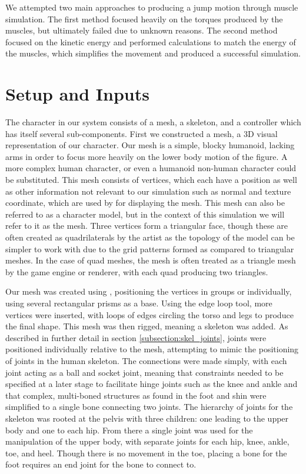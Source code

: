 We attempted two main approaches to producing a jump motion through muscle simulation.  The first method focused heavily on the torques produced by the muscles, but ultimately failed due to unknown reasons.  The second method focused on the kinetic energy and performed calculations to match the energy of the muscles, which simplifies the movement and produced a successful simulation.

\section{Setup and Inputs}
\label{section:setup_inputs}
The character in our system consists of a mesh, a skeleton, and a controller which has itself several sub-components.  First we constructed a mesh, a 3D visual representation of our character.  Our mesh is a simple, blocky humanoid, lacking arms in order to focus more heavily on the lower body motion of the figure.  A more complex human character, or even a humanoid non-human character could be substituted.  This mesh consists of vertices, which each have a position as well as other information not relevant to our simulation such as normal and texture coordinate, which are used by \unity for displaying the mesh.  This mesh can also be referred to as a character model, but in the context of this simulation we will refer to it as the mesh.  Three vertices form a triangular face, though these are often created as quadrilaterals by the artist as the topology of the model can be simpler to work with due to the grid patterns formed as compared to triangular meshes.  In the case of quad meshes, the mesh is often treated as a triangle mesh by the game engine or renderer, with each quad producing two triangles.

Our mesh was created using \maya, positioning the vertices in groups or individually, using several rectangular prisms as a base.  Using the edge loop tool, more vertices were inserted, with loops of edges circling the torso and legs to produce the final shape.  This mesh was then rigged, meaning a skeleton was added.  As described in further detail in section \ref{subsection:skel_joints}, joints were positioned individually relative to the mesh, attempting to mimic the positioning of joints in the human skeleton.  The connections were made simply, with each joint acting as a ball and socket joint, meaning that constraints needed to be specified at a later stage to facilitate hinge joints such as the knee and ankle and that complex, multi-boned structures as found in the foot and shin were simplified to a single bone connecting two joints.  The hierarchy of joints for the skeleton was rooted at the pelvis with three children: one leading to the upper body and one to each hip.  From there a single joint was used for the manipulation of the upper body, with separate joints for each hip, knee, ankle, toe, and heel.  Though there is no movement in the toe, placing a bone for the foot requires an end joint for the bone to connect to.

